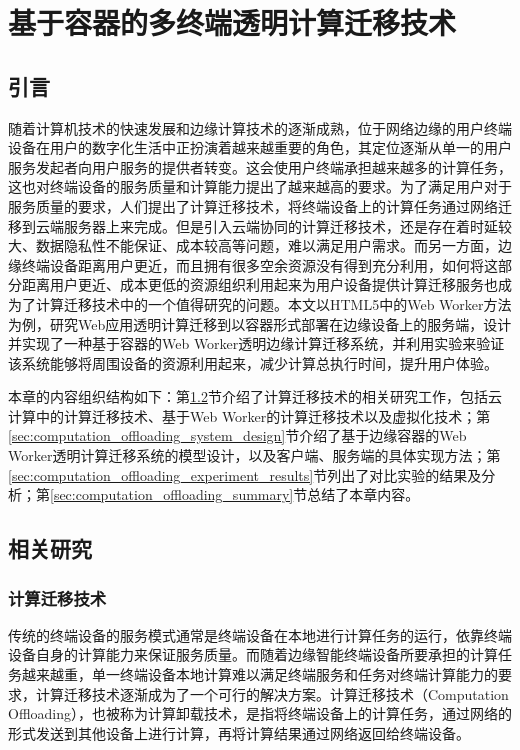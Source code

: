 
\chapter{基于容器的多终端透明计算迁移技术}\label{chap:computation_offloading}

\section{引言}

随着计算机技术的快速发展和边缘计算技术的逐渐成熟，位于网络边缘的用户终端设备在用户的数字化生活中正扮演着越来越重要的角色，其定位逐渐从单一的用户服务发起者向用户服务的提供者转变。这会使用户终端承担越来越多的计算任务，这也对终端设备的服务质量和计算能力提出了越来越高的要求。为了满足用户对于服务质量的要求，人们提出了计算迁移技术，将终端设备上的计算任务通过网络迁移到云端服务器上来完成。但是引入云端协同的计算迁移技术，还是存在着时延较大、数据隐私性不能保证、成本较高等问题，难以满足用户需求。而另一方面，边缘终端设备距离用户更近，而且拥有很多空余资源没有得到充分利用，如何将这部分距离用户更近、成本更低的资源组织利用起来为用户设备提供计算迁移服务也成为了计算迁移技术中的一个值得研究的问题。本文以HTML5中的Web Worker方法为例，研究Web应用透明计算迁移到以容器形式部署在边缘设备上的服务端，设计并实现了一种基于容器的Web Worker透明边缘计算迁移系统，并利用实验来验证该系统能够将周围设备的资源利用起来，减少计算总执行时间，提升用户体验。

本章的内容组织结构如下：第\ref{sec:computation_offloading_related_work}节介绍了计算迁移技术的相关研究工作，包括云计算中的计算迁移技术、基于Web Worker的计算迁移技术以及虚拟化技术；第\ref{sec:computation_offloading_system_design}节介绍了基于边缘容器的Web Worker透明计算迁移系统的模型设计，以及客户端、服务端的具体实现方法；第\ref{sec:computation_offloading_experiment_results}节列出了对比实验的结果及分析；第\ref{sec:computation_offloading_summary}节总结了本章内容。

\section{相关研究} \label{sec:computation_offloading_related_work}

\subsection{计算迁移技术}

传统的终端设备的服务模式通常是终端设备在本地进行计算任务的运行，依靠终端设备自身的计算能力来保证服务质量。而随着边缘智能终端设备所要承担的计算任务越来越重，单一终端设备本地计算难以满足终端服务和任务对终端计算能力的要求，计算迁移技术逐渐成为了一个可行的解决方案\cite{张文丽2016智能移动终端计算迁移研究}。计算迁移技术（Computation Offloading），也被称为计算卸载技术，是指将终端设备上的计算任务，通过网络的形式发送到其他设备上进行计算，再将计算结果通过网络返回给终端设备。

